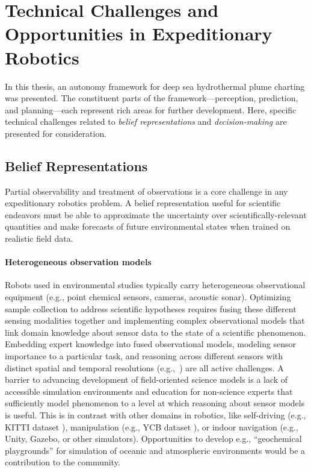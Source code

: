 \section{Technical Challenges and Opportunities in Expeditionary Robotics}
\label{sec:challenges}
In this thesis, an autonomy framework for deep sea hydrothermal plume charting was presented. The constituent parts of the framework---perception, prediction, and planning---each represent rich areas for further development. Here, specific technical challenges related to \emph{belief representations} and \emph{decision-making} are presented for consideration.

\subsection{Belief Representations}
Partial observability and treatment of observations is a core challenge in any expeditionary robotics problem. A belief representation useful for scientific endeavors must be able to approximate the uncertainty over scientifically-relevant quantities and make forecasts of future environmental states when trained on realistic field data. 

\paragraph{Heterogeneous observation models}
Robots used in environmental studies typically carry heterogeneous observational equipment (e.g., point chemical sensors, cameras, acoustic sonar). Optimizing sample collection to address scientific hypotheses requires fusing these different sensing modalities together and implementing complex observational models that link domain knowledge about sensor data to the state of a scientific phenomenon. Embedding expert knowledge into fused observational models, modeling sensor importance to a particular task, and reasoning across different sensors with distinct spatial and temporal resolutions (e.g.,~\cite{sarkar2014sensor}) are all active challenges. A barrier to advancing development of field-oriented science models is a lack of accessible simulation environments and education for non-science experts that sufficiently model phenomenon to a level at which reasoning about sensor models is useful. This is in contrast with other domains in robotics, like self-driving (e.g., KITTI dataset \autocite{geiger2012we}), manipulation (e.g., YCB dataset \autocite{calli2017yale}), or indoor navigation (e.g., Unity, Gazebo, or other simulators). Opportunities to develop e.g., ``geochemical playgrounds'' for simulation of oceanic and atmospheric environments would be a contribution to the community.

